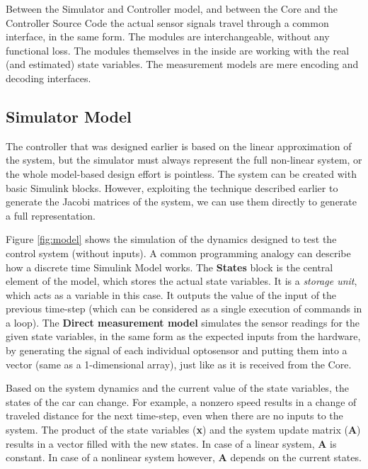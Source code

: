 Between the Simulator and Controller model, and between the Core and the Controller Source Code the actual sensor signals travel through a common interface, in the same form. The modules are interchangeable, without any functional loss. The modules themselves in the inside are working with the real (and estimated) state variables. The measurement models are mere encoding and decoding interfaces.


\subsection{Simulator Model}

The controller that was designed earlier is based on the linear approximation of the system, but the simulator must always represent the full non-linear system, or the whole model-based design effort is pointless. The system can be created with basic \textsf{Simulink} blocks. However, exploiting the technique described earlier to generate the Jacobi matrices of the system, we can use them directly to generate a full representation.

Figure \ref{fig:model} shows the simulation of the dynamics designed to test the control system (without inputs). A common programming analogy can describe how a discrete time \textsf{Simulink} \textsf{Model} works. The \textbf{States} block is the central element of the model, which stores the actual state variables. It is a \emph{storage unit}, which acts as a variable in this case. It outputs the value of the input of the previous time-step (which can be considered as a single execution of commands in a loop). The \textbf{Direct measurement model} simulates the sensor readings for the given state variables, in the same form as the expected inputs from the hardware, by generating the signal of each individual optosensor and putting them into a vector (same as a 1-dimensional array), just like as it is received from the Core.

Based on the system dynamics and the current value of the state variables, the states of the car can change. For example, a nonzero speed results in a change of traveled distance for the next time-step, even when there are no inputs to the system. The product of the state variables (\textbf{x}) and the system update matrix (\textbf{A}) results in a vector filled with the new states. In case of a linear system, \textbf{A} is constant. In case of a nonlinear system however, \textbf{A} depends on the current states. 

